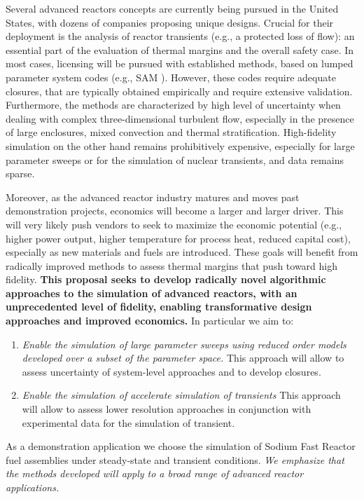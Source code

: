Several  advanced reactors concepts are currently being pursued in the United
States, with dozens of companies proposing unique designs. Crucial for their
deployment is the analysis of  reactor transients (e.g., a protected loss of
flow): an essential part of the evaluation of thermal margins and the overall
safety case.  In most cases, licensing will be pursued with established
methods, based on lumped parameter system codes (e.g., SAM \cite{hu2021}).
However, these codes require adequate closures, that are typically obtained
empirically and require extensive validation. Furthermore, the methods are
characterized by high level of uncertainty when dealing with complex
three-dimensional turbulent flow, especially in the presence of large
enclosures, mixed convection and thermal stratification. High-fidelity
simulation on the other hand remains prohibitively expensive, especially for
large parameter sweeps or for the simulation of nuclear transients, and data
remains sparse.

Moreover, as the advanced reactor industry matures and moves past demonstration
projects, economics will become a larger and larger driver. This will very
likely push vendors to seek to maximize the economic potential (e.g., higher
power output, higher temperature for process heat, reduced capital cost),
especially as new materials and fuels are introduced. These goals will benefit
from radically improved methods to assess thermal margins that push toward high
fidelity. \textbf{This proposal seeks to develop radically novel algorithmic
approaches to the simulation of advanced reactors, with an unprecedented level
of fidelity, enabling transformative design approaches and improved economics.}
In particular we aim to:
\begin{enumerate}
%
   \item \textit{Enable the simulation of large parameter sweeps using reduced
   order models developed over a subset of the parameter space.} This approach
   will allow to assess uncertainty of system-level approaches and to develop
   closures.
%
   \item \textit{Enable the simulation of accelerate simulation of transients }
   This approach will allow to assess lower resolution approaches in conjunction
   with experimental data for the simulation of transient.
\end{enumerate}
As a demonstration application we choose the simulation of Sodium Fast Reactor
fuel assemblies under steady-state and transient conditions. \textit{ We
emphasize that the methods developed will apply to a broad range of advanced
reactor applications.}

